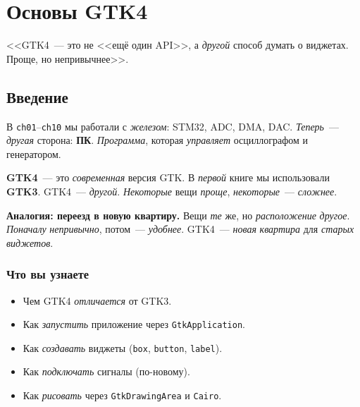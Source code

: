 
\chapter{Основы GTK4}
\label{ch:gtk4-basics}

\epigraph{<<GTK4~--- это не <<ещё один API>>, а \emph{другой}
способ думать о виджетах. Проще, но непривычнее>>.}{}

\section{Введение}
\label{sec:gtk4-intro}

В \texttt{ch01}--\texttt{ch10} мы работали с \emph{железом}:
STM32, ADC, DMA, DAC. \emph{Теперь}~--- \emph{другая} сторона:
\textbf{ПК}. \emph{Программа}, которая \emph{управляет}
осциллографом и генератором.

\textbf{GTK4}~--- это \emph{современная} версия GTK.
В \emph{первой} книге мы использовали \textbf{GTK3}. GTK4~---
\emph{другой}. \emph{Некоторые} вещи \emph{проще},
\emph{некоторые}~--- \emph{сложнее}.

\begin{ideabox}
\textbf{Аналогия: переезд в новую квартиру.} Вещи \emph{те}
же, но \emph{расположение} \emph{другое}. \emph{Поначалу}
\emph{непривычно}, потом~--- \emph{удобнее}.
GTK4~--- \emph{новая} \emph{квартира} для \emph{старых}
\emph{виджетов}.
\end{ideabox}

\subsection{Что вы узнаете}

\begin{itemize}
    \item Чем GTK4 \emph{отличается} от GTK3.
    \item Как \emph{запустить} приложение через \texttt{GtkApplication}.
    \item Как \emph{создавать} виджеты (\texttt{box}, \texttt{button}, \texttt{label}).
    \item Как \emph{подключать} сигналы (по-новому).
    \item Как \emph{рисовать} через \texttt{GtkDrawingArea} и \texttt{Cairo}.
\end{itemize}

